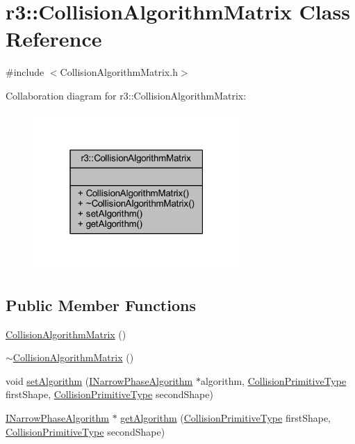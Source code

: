 \hypertarget{classr3_1_1_collision_algorithm_matrix}{}\section{r3\+:\+:Collision\+Algorithm\+Matrix Class Reference}
\label{classr3_1_1_collision_algorithm_matrix}


{\ttfamily \#include $<$Collision\+Algorithm\+Matrix.\+h$>$}



Collaboration diagram for r3\+:\+:Collision\+Algorithm\+Matrix\+:\nopagebreak
\begin{figure}[H]
\begin{center}
\leavevmode
\includegraphics[width=223pt]{classr3_1_1_collision_algorithm_matrix__coll__graph}
\end{center}
\end{figure}
\subsection*{Public Member Functions}
\begin{DoxyCompactItemize}
\item 
\mbox{\hyperlink{classr3_1_1_collision_algorithm_matrix_a97bdad626057f600ae5ffca63eb174b8}{Collision\+Algorithm\+Matrix}} ()
\item 
\mbox{\hyperlink{classr3_1_1_collision_algorithm_matrix_adea2db794d9606ecf24745ad6ac912d8}{$\sim$\+Collision\+Algorithm\+Matrix}} ()
\item 
void \mbox{\hyperlink{classr3_1_1_collision_algorithm_matrix_a6ddf117fbce8a3216b4b4413ccade6d0}{set\+Algorithm}} (\mbox{\hyperlink{classr3_1_1_i_narrow_phase_algorithm}{I\+Narrow\+Phase\+Algorithm}} $\ast$algorithm, \mbox{\hyperlink{namespacer3_a7079ec5e42c1a55140d3bc093d49e319}{Collision\+Primitive\+Type}} first\+Shape, \mbox{\hyperlink{namespacer3_a7079ec5e42c1a55140d3bc093d49e319}{Collision\+Primitive\+Type}} second\+Shape)
\item 
\mbox{\hyperlink{classr3_1_1_i_narrow_phase_algorithm}{I\+Narrow\+Phase\+Algorithm}} $\ast$ \mbox{\hyperlink{classr3_1_1_collision_algorithm_matrix_ad40e0f125b95d6bcdb2e8a27c1397e68}{get\+Algorithm}} (\mbox{\hyperlink{namespacer3_a7079ec5e42c1a55140d3bc093d49e319}{Collision\+Primitive\+Type}} first\+Shape, \mbox{\hyperlink{namespacer3_a7079ec5e42c1a55140d3bc093d49e319}{Collision\+Primitive\+Type}} second\+Shape)
\end{DoxyCompactItemize}


